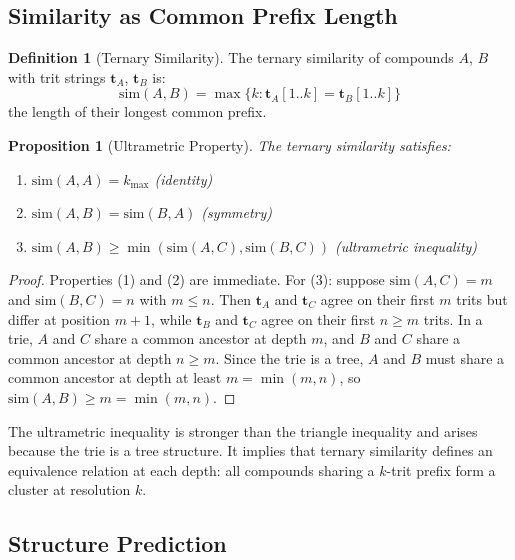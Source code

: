 \documentclass[11pt,twocolumn,a4paper]{article}
\newtheorem{proposition}[theorem]{Proposition}
\theoremstyle{definition}
\newtheorem{definition}[theorem]{Definition}
\theoremstyle{remark}
\begin{document}
\subsection{Similarity as Common Prefix Length}

\begin{definition}[Ternary Similarity]
\label{def:similarity}
The ternary similarity of compounds $A$, $B$ with trit strings $\mathbf{t}_A$, $\mathbf{t}_B$ is:
\begin{equation}
\mathrm{sim}(A, B) = \max\{k : \mathbf{t}_A[1..k] = \mathbf{t}_B[1..k]\}
\label{eq:similarity}
\end{equation}
the length of their longest common prefix.
\end{definition}

\begin{proposition}[Ultrametric Property]
\label{prop:ultrametric}
The ternary similarity satisfies:
\begin{enumerate}[nosep]
\item $\mathrm{sim}(A, A) = k_{\max}$ \hfill (identity)
\item $\mathrm{sim}(A, B) = \mathrm{sim}(B, A)$ \hfill (symmetry)
\item $\mathrm{sim}(A, B) \geq \min(\mathrm{sim}(A, C), \mathrm{sim}(B, C))$ \hfill (ultrametric inequality)
\end{enumerate}
\end{proposition}

\begin{proof}
Properties (1) and (2) are immediate. For (3): suppose $\mathrm{sim}(A,C) = m$ and $\mathrm{sim}(B,C) = n$ with $m \leq n$. Then $\mathbf{t}_A$ and $\mathbf{t}_C$ agree on their first $m$ trits but differ at position $m+1$, while $\mathbf{t}_B$ and $\mathbf{t}_C$ agree on their first $n \geq m$ trits. In a trie, $A$ and $C$ share a common ancestor at depth $m$, and $B$ and $C$ share a common ancestor at depth $n \geq m$. Since the trie is a tree, $A$ and $B$ must share a common ancestor at depth at least $m = \min(m, n)$, so $\mathrm{sim}(A, B) \geq m = \min(m, n)$.
\end{proof}

The ultrametric inequality is stronger than the triangle inequality and arises because the trie is a tree structure. It implies that ternary similarity defines an equivalence relation at each depth: all compounds sharing a $k$-trit prefix form a cluster at resolution $k$.

\subsection{Structure Prediction}
\end{document}
